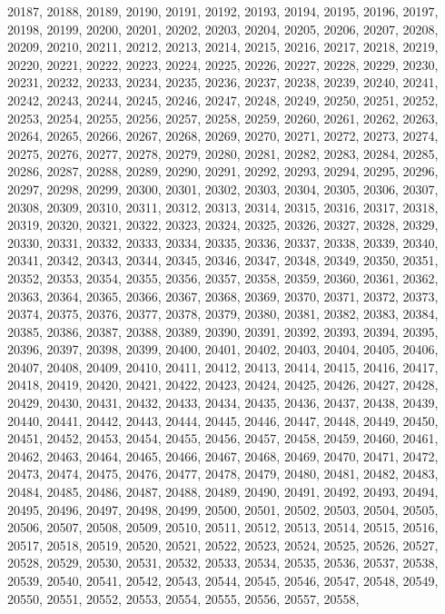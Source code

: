 20187,
20188,
20189,
20190,
20191,
20192,
20193,
20194,
20195,
20196,
20197,
20198,
20199,
20200,
20201,
20202,
20203,
20204,
20205,
20206,
20207,
20208,
20209,
20210,
20211,
20212,
20213,
20214,
20215,
20216,
20217,
20218,
20219,
20220,
20221,
20222,
20223,
20224,
20225,
20226,
20227,
20228,
20229,
20230,
20231,
20232,
20233,
20234,
20235,
20236,
20237,
20238,
20239,
20240,
20241,
20242,
20243,
20244,
20245,
20246,
20247,
20248,
20249,
20250,
20251,
20252,
20253,
20254,
20255,
20256,
20257,
20258,
20259,
20260,
20261,
20262,
20263,
20264,
20265,
20266,
20267,
20268,
20269,
20270,
20271,
20272,
20273,
20274,
20275,
20276,
20277,
20278,
20279,
20280,
20281,
20282,
20283,
20284,
20285,
20286,
20287,
20288,
20289,
20290,
20291,
20292,
20293,
20294,
20295,
20296,
20297,
20298,
20299,
20300,
20301,
20302,
20303,
20304,
20305,
20306,
20307,
20308,
20309,
20310,
20311,
20312,
20313,
20314,
20315,
20316,
20317,
20318,
20319,
20320,
20321,
20322,
20323,
20324,
20325,
20326,
20327,
20328,
20329,
20330,
20331,
20332,
20333,
20334,
20335,
20336,
20337,
20338,
20339,
20340,
20341,
20342,
20343,
20344,
20345,
20346,
20347,
20348,
20349,
20350,
20351,
20352,
20353,
20354,
20355,
20356,
20357,
20358,
20359,
20360,
20361,
20362,
20363,
20364,
20365,
20366,
20367,
20368,
20369,
20370,
20371,
20372,
20373,
20374,
20375,
20376,
20377,
20378,
20379,
20380,
20381,
20382,
20383,
20384,
20385,
20386,
20387,
20388,
20389,
20390,
20391,
20392,
20393,
20394,
20395,
20396,
20397,
20398,
20399,
20400,
20401,
20402,
20403,
20404,
20405,
20406,
20407,
20408,
20409,
20410,
20411,
20412,
20413,
20414,
20415,
20416,
20417,
20418,
20419,
20420,
20421,
20422,
20423,
20424,
20425,
20426,
20427,
20428,
20429,
20430,
20431,
20432,
20433,
20434,
20435,
20436,
20437,
20438,
20439,
20440,
20441,
20442,
20443,
20444,
20445,
20446,
20447,
20448,
20449,
20450,
20451,
20452,
20453,
20454,
20455,
20456,
20457,
20458,
20459,
20460,
20461,
20462,
20463,
20464,
20465,
20466,
20467,
20468,
20469,
20470,
20471,
20472,
20473,
20474,
20475,
20476,
20477,
20478,
20479,
20480,
20481,
20482,
20483,
20484,
20485,
20486,
20487,
20488,
20489,
20490,
20491,
20492,
20493,
20494,
20495,
20496,
20497,
20498,
20499,
20500,
20501,
20502,
20503,
20504,
20505,
20506,
20507,
20508,
20509,
20510,
20511,
20512,
20513,
20514,
20515,
20516,
20517,
20518,
20519,
20520,
20521,
20522,
20523,
20524,
20525,
20526,
20527,
20528,
20529,
20530,
20531,
20532,
20533,
20534,
20535,
20536,
20537,
20538,
20539,
20540,
20541,
20542,
20543,
20544,
20545,
20546,
20547,
20548,
20549,
20550,
20551,
20552,
20553,
20554,
20555,
20556,
20557,
20558,
